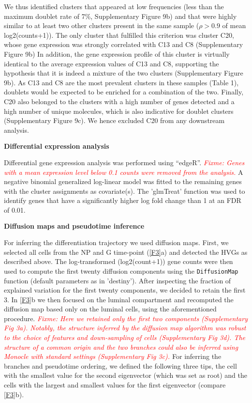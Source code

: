 \documentclass[titlepage, 12pt, oneside]{amsart}
\newcommand{\fixme}[1]{\textit{\textcolor{red}{Fixme: #1}}}
\begin{document}
We thus identified clusters that appeared at low frequencies (less than the maximum doublet rate of 7\%, Supplementary Figure 9b) and that were highly similar to at least two other clusters present in the same sample ($\rho > 0.9$ of mean log2(counts+1)).
The only cluster that fulfilled this criterion was cluster C20, whose gene expression was strongly correlated with C13 and C8 (Supplementary Figure 9b)
In addition, the gene expression profile of this cluster is virtually identical to the average expression values of C13 and C8, supporting the hypothesis that it is indeed a mixture of the two clusters (Supplementary Figure 9b).
As C13 and C8 are the most prevalent clusters in these samples (Table 1), doublets would be expected to be enriched for a combination of the two.
Finally, C20 also belonged to the clusters with a high number of genes detected and a high number of unique molecules, which is also indicative for doublet clusters (Supplementary Figure 9c).
We hence excluded C20 from any downstream analysis.

\textbf{Differential expression analysis }

Differential gene expression analysis was performed using ``edgeR''\autocite{Robinson2010}.
\fixme{Genes with a mean expression level below 0.1 counts were removed from the analysis.}
A negative binomial generalized log-linear model was fitted to the remaining genes with the cluster assignments as covariate(s).
The 'glmTreat' function was used to identify genes that have a significantly higher log fold change than 1 at an FDR of 0.01.

\textbf{Diffusion maps and pseudotime inference}

For inferring the differentiation trajectory we used diffusion maps.
First, we selected all cells from the NP and G time-point (\autoref{F3}a) and detected the HVGs as described above.
The log-transformed (log2(count+1)) gene counts were then used to compute the first twenty diffusion components using the \texttt{DiffusionMap} function (default parameters as in 'destiny'\autocite{Angerer2016}).
After inspecting the fraction of explained variation for the first twenty components, we decided to retain the first 3.
In \autoref{F3}b we then focused on the luminal compartment and recomputed the diffusion map based only on the luminal cells, using the aforementioned procedure.
\fixme{Here we retained only the first two components (Supplementary Fig 3a).
Notably, the structure inferred by the diffusion map algorithm was robust to the choice of features and down-sampling of cells (Supplementary Fig 3d).
The structure of a common origin and the two branches could also be inferred using Monocle with standard settings\autocite{Trapnell2014} (Supplementary Fig 3c).
}
For inferring the branches and pseudotime ordering, we defined the following three tips, the cell with the smallest value for the second eigenvector (which was set as root) and the cells with the largest and smallest values for the first eigenvector (compare \autoref{F3}b).  
\end{document}
